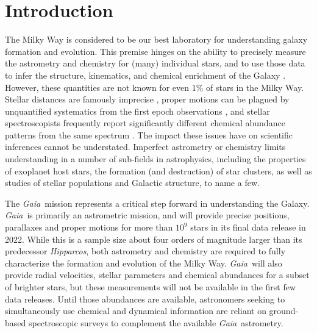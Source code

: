 \documentclass[preprint]{aastex}
\newcommand{\project}[1]{\textsl{#1}}
\newcommand{\gaia}{\project{Gaia}}
\newcommand{\hipparcos}{\project{Hipparcos}}
\begin{document}


\section{Introduction} 
\label{sec:introduction}

The Milky Way is considered to be our best laboratory for understanding galaxy
formation and evolution.  This premise hinges on the ability to precisely measure 
the astrometry and chemistry for (many) individual stars, and to use those data 
to infer the structure, kinematics, and chemical enrichment of the Galaxy 
\citep[e.g.,][]{Nordstrom_2004,Schlaufman_2009,Deason_2011,Casagrande_2011,
Ness_2012,Ness_2013a,Ness_2013b,Casey_2012,Casey_2013,Casey_2014a,Casey_2014b,
Boeche_2013,Kordopatis_2015,Bovy_2016}.  However, these quantities are not known
for even 1\% of stars in the Milky Way.  Stellar distances are famously imprecise 
\citep[e.g.,][]{van_Leeuwen_2007,Jofre_2015,Madler_2016}, proper motions can be
plagued by unquantified systematics from the first epoch observations 
\citep[e.g.,][]{Casey_Schlaufman_2015}, and stellar spectroscopists frequently 
report significantly different chemical abundance patterns from the same spectrum 
\citep{Smiljanic_2014}.  The impact these issues have on scientific inferences 
cannot be understated.  Imperfect astrometry or chemistry limits understanding 
in a number of sub-fields in astrophysics, including the properties of exoplanet 
host stars, the formation (and destruction) of star clusters, as well as studies
of stellar populations and Galactic structure, to name a few.


The \gaia\ mission represents a critical step forward in understanding the Galaxy.
\gaia\ is primarily an astrometric mission, and will provide precise positions,
parallaxes and proper motions for more than $10^9$ stars in its final data
release in 2022.  While this is a sample size about four orders of magnitude 
larger than its predecessor \hipparcos, both astrometry and chemistry are 
required to fully characterize the formation and evolution of the Milky Way. 
\gaia\ will also provide radial velocities, stellar parameters and chemical 
abundances for a subset of brighter stars, but these measurements will not be 
available in the first few data releases. Until those abundances are available,
astronomers seeking to simultaneously use chemical and dynamical information are
reliant on ground-based spectroscopic surveys to complement the available 
\gaia\ astrometry.
\end{document}
